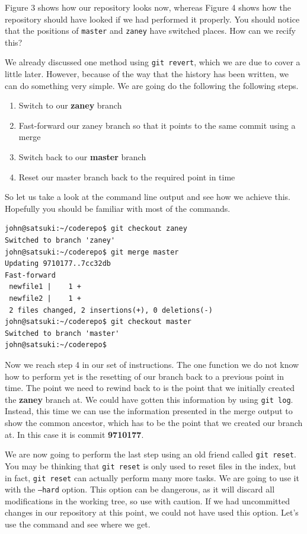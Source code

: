 Figure 3 shows how our repository looks now, whereas Figure 4 shows how the repository should have looked if we had performed it properly.
You should notice that the positions of \texttt{master} and \texttt{zaney} have switched places.
How can we recify this?

We already discussed one method using \texttt{git revert}, which we are due to cover a little later.
However, because of the way that the history has been written, we can do something very simple.
We are going do the following the following steps.

\begin{enumerate}
\item Switch to our \textbf{zaney} branch
\item Fast-forward our zaney branch so that it points to the same commit using a merge
\item Switch back to our \textbf{master} branch
\item Reset our master branch back to the required point in time
\end{enumerate}

So let us take a look at the command line output and see how we achieve this.
Hopefully you should be familiar with most of the commands.

\begin{Verbatim}
john@satsuki:~/coderepo$ git checkout zaney
Switched to branch 'zaney'
john@satsuki:~/coderepo$ git merge master
Updating 9710177..7cc32db
Fast-forward
 newfile1 |    1 +
 newfile2 |    1 +
 2 files changed, 2 insertions(+), 0 deletions(-)
john@satsuki:~/coderepo$ git checkout master
Switched to branch 'master'
john@satsuki:~/coderepo$
\end{Verbatim}

Now we reach step 4 in our set of instructions.
The one function we do not know how to perform yet is the resetting of our branch back to a previous point in time.
The point we need to rewind back to is the point that we initially created the \textbf{zaney} branch at.
We could have gotten this information by using \texttt{git log}.
Instead, this time we can use the information presented in the merge output to show the common ancestor, which has to be the point that we created our branch at.
In this case it is commit \textbf{9710177}.

We are now going to perform the last step using an old friend called \texttt{git reset}.
You may be thinking that \texttt{git reset} is only used to reset files in the index, but in fact, \texttt{git reset} can actually perform many more tasks.
We are going to use it with the \texttt{--hard} option.
This option can be dangerous, as it will discard all modifications in the working tree, so use with caution.
If we had uncommitted changes in our repository at this point, we could not have used this option.
Let's use the command and see where we get.

